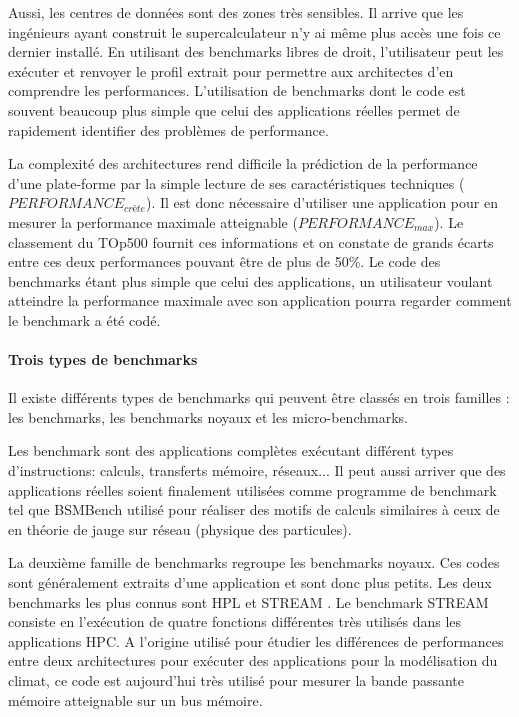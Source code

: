     
    Aussi, les centres de données sont des zones très sensibles. Il arrive que les ingénieurs ayant construit le supercalculateur n'y ai même plus accès une fois ce dernier installé. En utilisant des benchmarks libres de droit, l'utilisateur peut les exécuter et renvoyer le profil extrait pour permettre aux architectes d'en comprendre les performances. L'utilisation de benchmarks dont le code est souvent beaucoup plus simple que celui des applications réelles permet de rapidement identifier des problèmes de performance. 
    
    La complexité des architectures rend difficile la prédiction de la performance d'une plate-forme par la simple lecture de ses caractéristiques techniques ($PERFORMANCE_{crête}$). Il est donc nécessaire d'utiliser une application pour en mesurer la performance maximale atteignable ($PERFORMANCE_{max}$). Le classement du TOp500 fournit ces informations et on constate de grands écarts entre ces deux performances pouvant être de plus de 50\%. Le code des benchmarks étant plus simple que celui des applications, un utilisateur voulant atteindre la performance maximale avec son application pourra regarder comment le benchmark a été codé. 


\paragraph{Trois types de benchmarks} Il existe différents types de benchmarks qui peuvent être classés en trois familles \cite{Staelin2004}: les benchmarks, les benchmarks noyaux et les micro-benchmarks.
    
    Les benchmark sont des applications complètes exécutant différent types d'instructions: calculs, transferts mémoire, réseaux... Il peut aussi arriver que des applications réelles soient finalement utilisées comme programme de benchmark tel que BSMBench \cite{HPC:bsmbench} utilisé pour réaliser des motifs de calculs similaires à ceux de en théorie de jauge sur réseau (physique des particules).
    
    La deuxième famille de benchmarks regroupe les benchmarks noyaux. Ces codes sont généralement extraits d'une application et sont donc plus petits. Les deux benchmarks les plus connus sont HPL \cite{HPC:hpl} et STREAM \cite{HPC:stream}. Le benchmark STREAM consiste en l'exécution de quatre fonctions différentes très utilisés dans les applications HPC. A l'origine utilisé pour étudier les différences de performances entre deux architectures pour exécuter des applications pour la modélisation du climat, ce code est aujourd'hui très utilisé pour mesurer la bande passante mémoire atteignable sur un bus mémoire. 
   
